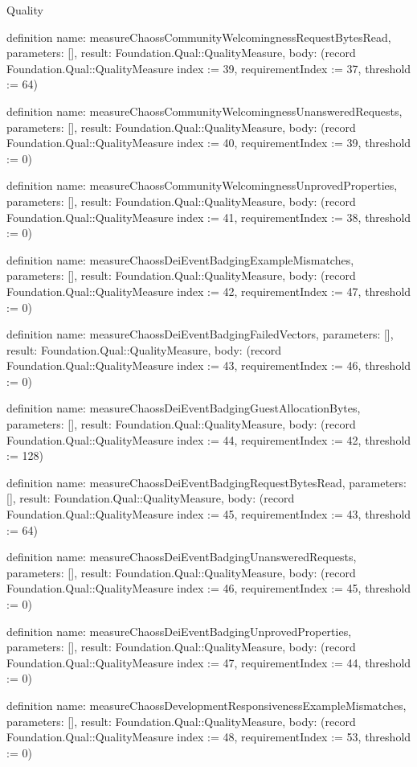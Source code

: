 \begin{lexlean}{Quality}
\begin{semanticmodule}
definition{
  name: measureChaossCommunityWelcomingnessRequestBytesRead,
  parameters: [],
  result: Foundation.Qual::QualityMeasure,
  body: (record Foundation.Qual::QualityMeasure {index := 39, requirementIndex := 37, threshold := 64})
}

definition{
  name: measureChaossCommunityWelcomingnessUnansweredRequests,
  parameters: [],
  result: Foundation.Qual::QualityMeasure,
  body: (record Foundation.Qual::QualityMeasure {index := 40, requirementIndex := 39, threshold := 0})
}

definition{
  name: measureChaossCommunityWelcomingnessUnprovedProperties,
  parameters: [],
  result: Foundation.Qual::QualityMeasure,
  body: (record Foundation.Qual::QualityMeasure {index := 41, requirementIndex := 38, threshold := 0})
}

definition{
  name: measureChaossDeiEventBadgingExampleMismatches,
  parameters: [],
  result: Foundation.Qual::QualityMeasure,
  body: (record Foundation.Qual::QualityMeasure {index := 42, requirementIndex := 47, threshold := 0})
}

definition{
  name: measureChaossDeiEventBadgingFailedVectors,
  parameters: [],
  result: Foundation.Qual::QualityMeasure,
  body: (record Foundation.Qual::QualityMeasure {index := 43, requirementIndex := 46, threshold := 0})
}

definition{
  name: measureChaossDeiEventBadgingGuestAllocationBytes,
  parameters: [],
  result: Foundation.Qual::QualityMeasure,
  body: (record Foundation.Qual::QualityMeasure {index := 44, requirementIndex := 42, threshold := 128})
}

definition{
  name: measureChaossDeiEventBadgingRequestBytesRead,
  parameters: [],
  result: Foundation.Qual::QualityMeasure,
  body: (record Foundation.Qual::QualityMeasure {index := 45, requirementIndex := 43, threshold := 64})
}

definition{
  name: measureChaossDeiEventBadgingUnansweredRequests,
  parameters: [],
  result: Foundation.Qual::QualityMeasure,
  body: (record Foundation.Qual::QualityMeasure {index := 46, requirementIndex := 45, threshold := 0})
}

definition{
  name: measureChaossDeiEventBadgingUnprovedProperties,
  parameters: [],
  result: Foundation.Qual::QualityMeasure,
  body: (record Foundation.Qual::QualityMeasure {index := 47, requirementIndex := 44, threshold := 0})
}

definition{
  name: measureChaossDevelopmentResponsivenessExampleMismatches,
  parameters: [],
  result: Foundation.Qual::QualityMeasure,
  body: (record Foundation.Qual::QualityMeasure {index := 48, requirementIndex := 53, threshold := 0})
}


\end{semanticmodule}
\end{lexlean}
